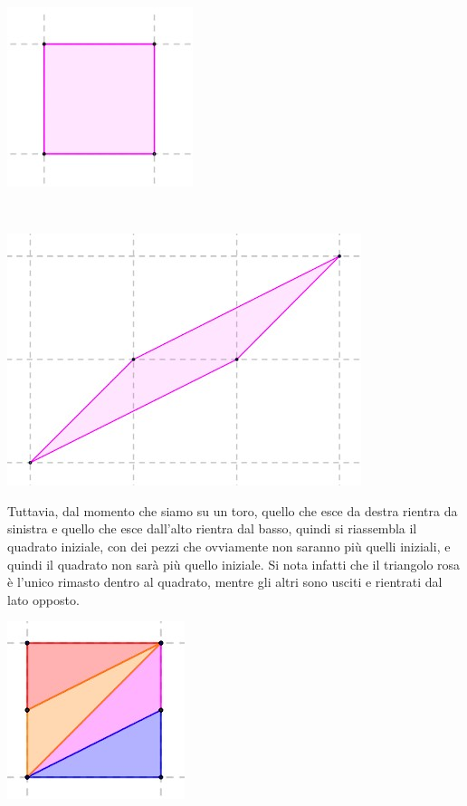 \documentclass[12pt]{article}
\begin{document}
\begin{center}
  \begin{minipage}[b]{0.4\textwidth}
    \hspace{1cm}\includegraphics[scale = .8]{Quadrato non trasformato}
  \end{minipage}
  \ \ \ \ \ \ \ \ \ \ \ \ \ \ \ \
  \begin{minipage}[b]{0.4\textwidth}
    \hspace{-2cm}\includegraphics[scale = .8]{Quadrato trasformato} \\
  \end{minipage}
\end{center}
Tuttavia, dal momento che siamo su un toro, quello che esce da destra rientra da sinistra e quello che esce dall'alto rientra dal basso, quindi si riassembla il quadrato iniziale, con dei pezzi che ovviamente non saranno più quelli iniziali, e quindi il quadrato non sarà più quello iniziale. Si nota infatti che il triangolo rosa è l'unico rimasto dentro al quadrato, mentre gli altri sono usciti e rientrati dal lato opposto.
\begin{center}
\includegraphics[scale=1.3]{Quadrato riassemblato}
\end{center}
\end{document}

